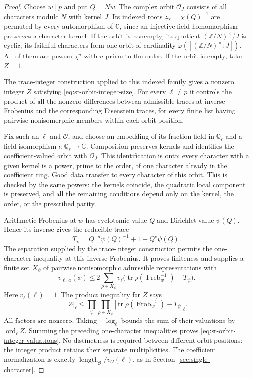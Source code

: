\begin{proof}
Choose $w\mid p$ and put $Q=Nw$. The complex orbit
$\mathcal O_J$ consists of all characters modulo $N$ with kernel $J$.
Its indexed roots $z_\chi=\chi(Q)^{-1}$ are permuted by every
automorphism of $\mathbb C$, since an injective field homomorphism
preserves a character kernel. If the orbit is nonempty, its quotient
$(\mathbb Z/N)^\times/J$ is cyclic; its faithful characters form one
orbit of cardinality $\varphi([(\mathbb Z/N)^\times:J])$.
All of them are powers $\chi^u$ with $u$ prime to the order.
If the orbit is empty, take $Z=1$.

The trace-integer construction applied to this indexed family gives
a nonzero integer $Z$ satisfying \eqref{eq:sr-orbit-integer-size}.
For every $\ell\ne p$ it controls the product of all the nonzero
differences between admissible traces at inverse Frobenius and the
corresponding Eisenstein traces, for every finite list having pairwise
nonisomorphic members within each orbit position.

Fix such an $\ell$ and $\mathcal O$, and choose an embedding of its
fraction field in $\overline{\mathbb Q}_\ell$ and a field isomorphism
$\iota:\overline{\mathbb Q}_\ell\to\mathbb C$.
Composition preserves kernels and identifies the coefficient-valued
orbit with $\mathcal O_J$. This identification is onto: every character
with a given kernel is a power, prime to the order, of one character
already in the coefficient ring. Good data transfer to every character
of this orbit. This is checked by the same powers: the kernels coincide,
the quadratic local component is preserved, and all the remaining
conditions depend only on the kernel, the order, or the prescribed parity.

Arithmetic Frobenius at $w$ has cyclotomic value $Q$ and Dirichlet
value $\psi(Q)$. Hence its inverse gives the reducible trace
\[
 T_\psi=Q^{-a}\psi(Q)^{-1}+1+Q^a\psi(Q).
\]
The separation supplied by the trace-integer construction permits the
one-character inequality at this inverse Frobenius. It proves finiteness
and supplies a finite set $X_\psi$ of pairwise nonisomorphic admissible
representations with
\[
 v_{\ell,a}(\psi)\le
       2\sum_{\rho\in X_\psi}
          v_\ell\bigl(\operatorname{tr}\rho(\operatorname{Frob}_w^{-1})
                                            -T_\psi\bigr).
\]
Here $v_\ell(\ell)=1$. The product inequality for $Z$ says
\[
 |Z|_\ell\le
       \prod_{\psi}\prod_{\rho\in X_\psi}
       \left|\operatorname{tr}\rho(\operatorname{Frob}_w^{-1})
                                            -T_\psi\right|_\ell .
\]
All factors are nonzero. Taking $-\log_\ell$ bounds the sum of their
valuations by $\operatorname{ord}_\ell Z$. Summing the preceding
one-character inequalities proves
\eqref{eq:sr-orbit-integer-valuations}.
No distinctness is required between different orbit positions: the
integer product retains their separate multiplicities.
The coefficient normalization is exactly
$\operatorname{length}_{\mathcal O}/v_{\mathcal O}(\ell)$, as in
Section~\ref{sec:single-character}.
\end{proof}

